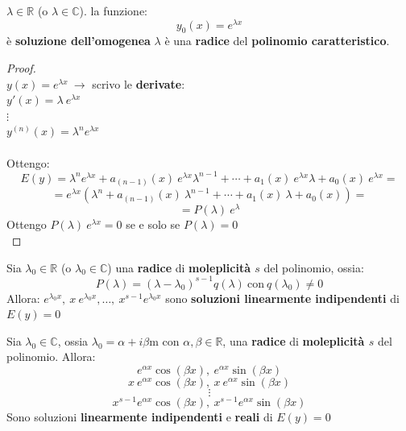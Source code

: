 \documentclass[a4paper, oneside]{article}
\newcommand\R{\mathbb{R}}
\newcommand\C{\mathbb{C}}
\begin{document}
    \begin{theorem}
         $\lambda\in\R$ (o $\lambda\in\C$).  la funzione:
        \[y_0(x) = e^{\lambda x}\]
        è \textbf{soluzione dell'omogenea}  $\lambda$ è una \textbf{radice} del \textbf{polinomio caratteristico}.

        \begin{proof}\hfill\\
            $y(x) = e^{\lambda x} \ \to$ scrivo le \textbf{derivate}:\\
            $y'(x) = \lambda \ e^{\lambda x}$\\
            $\vdots$\\
            $y^{(n)}(x) = \lambda^n e^{\lambda x}$\\\\
            Ottengo:\\
            \[E(y) = \lambda^ne^{\lambda x} + a_{(n-1)}(x) \ e^{\lambda x}\lambda^{n-1} + \cdots + a_1(x) \ e^{\lambda x}\lambda + a_0(x) \ e^{\lambda x} = \]
            \[=e^{\lambda x}\left(\lambda^n + a_{(n-1)}(x) \ \lambda^{n-1} + \cdots + a_1(x) \ \lambda + a_0(x)\right) =\]
            \[=P(\lambda) \ e^{\lambda}\]
            Ottengo $P(\lambda) \ e^{\lambda x}=0$ se e solo se $P(\lambda) = 0$\\
        \end{proof}
    \end{theorem}

    \begin{theorem}
        Sia $\lambda_0\in\R$ (o $\lambda_0\in\C$) una \textbf{radice} di \textbf{moleplicità $s$} del polinomio, ossia:
        \[P(\lambda) = \left(\lambda-\lambda_0\right)^{s-1}q(\lambda) \ \text{con} \ q(\lambda_0)\ne 0\]
        Allora:
        $e^{\lambda_0x}, \ x \ e^{\lambda_0x},\dots, \ x^{s-1}e^{\lambda_0x}$ sono \textbf{soluzioni linearmente indipendenti} di $E(y) = 0$
    \end{theorem}

    \begin{theorem}
        Sia $\lambda_0\in\C$, ossia $\lambda_0 = \alpha + i\beta$m con $\alpha,\beta\in\R$, una \textbf{radice} di \textbf{moleplicità $s$} del polinomio. 
        Allora:
        \[e^{\alpha x}\cos(\beta x), \ e^{\alpha x}\sin(\beta x)\]
        \[x \ e^{\alpha x}\cos(\beta x), \ x \ e^{\alpha x}\sin(\beta x)\]
        \[\vdots\] 
        \[x^{s-1}e^{\alpha x}\cos(\beta x), \ x^{s-1}e^{\alpha x}\sin(\beta x)\]
        Sono soluzioni \textbf{linearmente indipendenti} e \textbf{reali} di $E(y) = 0$
    \end{theorem}
    
\end{document}
